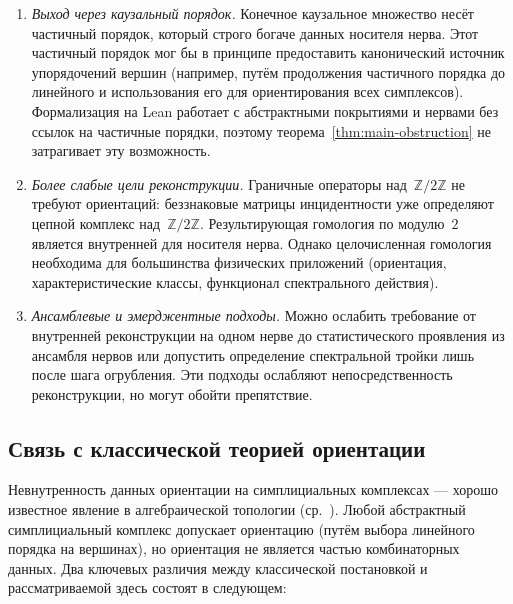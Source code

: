 \documentclass[11pt,a4paper]{article}
\theoremstyle{plain}
\theoremstyle{definition}
\theoremstyle{remark}
\newcommand{\ZZ}{\mathbb{Z}}
\begin{document}
\begin{enumerate}[nosep]
  \item \emph{Выход через каузальный порядок.}
    Конечное каузальное множество несёт частичный порядок, который
    строго богаче данных носителя нерва. Этот частичный порядок
    мог бы в принципе предоставить канонический источник упорядочений
    вершин (например, путём продолжения частичного порядка до линейного
    и использования его для ориентирования всех симплексов). Формализация
    на Lean работает с абстрактными покрытиями и нервами без ссылок на
    частичные порядки, поэтому теорема~\ref{thm:main-obstruction} не
    затрагивает эту возможность.

  \item \emph{Более слабые цели реконструкции.}
    Граничные операторы над~$\ZZ/2\ZZ$ не требуют ориентаций:
    беззнаковые матрицы инцидентности уже определяют цепной комплекс
    над~$\ZZ/2\ZZ$. Результирующая гомология по модулю~$2$ является
    внутренней для носителя нерва. Однако целочисленная гомология
    необходима для большинства физических приложений (ориентация,
    характеристические классы, функционал спектрального действия).

  \item \emph{Ансамблевые и эмерджентные подходы.}
    Можно ослабить требование от внутренней реконструкции на одном нерве
    до статистического проявления из ансамбля нервов или допустить
    определение спектральной тройки лишь после шага огрубления.
    Эти подходы ослабляют непосредственность реконструкции, но
    могут обойти препятствие.
\end{enumerate}

\subsection{Связь с классической теорией ориентации}

Невнутренность данных ориентации на симплициальных комплексах ---
хорошо известное явление в алгебраической топологии
(ср.~\cite{Hatcher:2002,Munkres:1984}). Любой абстрактный симплициальный
комплекс допускает ориентацию (путём выбора линейного порядка на
вершинах), но ориентация не является частью комбинаторных данных. Два
ключевых различия между классической постановкой и рассматриваемой здесь
состоят в следующем:
\end{document}
